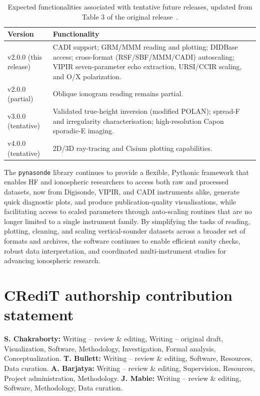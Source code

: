 \documentclass[12pt,a4paper]{article}
\begin{document}
\begin{table}[h!]
\caption{Expected functionalities associated with tentative future releases,
updated from Table 3 of the original release~\cite{Chakraborty2026}.}
\label{tab:roadmap}
\centering
\begin{tabular}{@{}lp{9.5cm}@{}}
\toprule
\textbf{Version} & \textbf{Functionality} \\
\midrule
v2.0.0 (this release) & CADI support; GRM/MMM reading and plotting; DIDBase
  access; cross-format (RSF/SBF/MMM/CADI) autoscaling; VIPIR seven-parameter
  echo extraction, URSI/CCIR scaling, and O/X polarization. \\
v2.0.0 (partial) & Oblique ionogram reading remains partial. \\
v3.0.0 (tentative) & Validated true-height inversion (modified POLAN); spread-F
  and irregularity characterisation; high-resolution Capon sporadic-E
  imaging. \\
v4.0.0 (tentative) & 2D/3D ray-tracing and Cisium plotting capabilities. \\
\bottomrule
\end{tabular}
\end{table}

The \texttt{pynasonde} library continues to provide a flexible, Pythonic
framework that enables HF and ionospheric researchers to access both raw and
processed datasets, now from Digisonde, VIPIR, and CADI instruments alike,
generate quick diagnostic plots, and produce publication-quality
visualisations, while facilitating access to scaled parameters through
auto-scaling routines that are no longer limited to a single instrument
family. By simplifying the tasks of reading, plotting, cleaning, and scaling
vertical-sounder datasets across a broader set of formats and archives, the
software continues to enable efficient sanity checks, robust data
interpretation, and coordinated multi-instrument studies for advancing
ionospheric research.

\section*{CRediT authorship contribution statement}

\textbf{S. Chakraborty:} Writing -- review \& editing, Writing -- original
draft, Visualization, Software, Methodology, Investigation, Formal analysis,
Conceptualization. \textbf{T. Bullett:} Writing -- review \& editing,
Software, Resources, Data curation. \textbf{A. Barjatya:} Writing -- review
\& editing, Supervision, Resources, Project administration, Methodology.
\textbf{J. Mabie:} Writing -- review \& editing, Software, Methodology, Data
curation.
\end{document}
